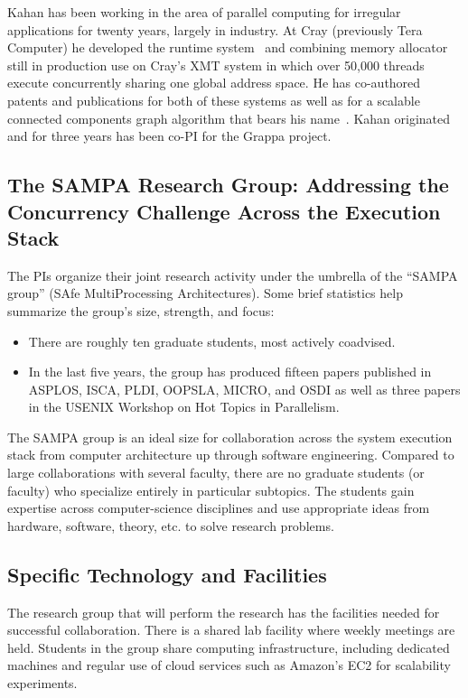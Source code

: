 Kahan has been working in the area of parallel computing for irregular applications for twenty years, largely in industry.  At Cray (previously Tera Computer) he developed the runtime system~\cite{Alverson95schedulingon,Alverson97terahardware-software} and combining memory allocator~\cite{MAMA} still in production use on Cray's XMT system in which over 50,000 threads execute concurrently sharing one global address space.  He has co-authored patents and publications for both of these systems as well as for a scalable connected components graph algorithm that bears his name~\cite{Underwood07analyzingthe}. Kahan originated and for three years has been co-PI for the Grappa project.

\subsection*{The SAMPA Research Group: Addressing the Concurrency
  Challenge Across the Execution Stack}

The PIs organize their joint research activity under the umbrella of
the ``SAMPA group'' (SAfe MultiProcessing Architectures).  Some brief
statistics help summarize the group's size, strength, and focus:
\begin{itemize}
\item There are roughly ten graduate students, most actively
  coadvised.
\item In the last five years, the group has produced fifteen papers
  published in ASPLOS, ISCA, PLDI, OOPSLA, MICRO, and OSDI as well as three
  papers in the USENIX Workshop on Hot Topics in Parallelism.
\end{itemize}
The SAMPA group is an ideal size for collaboration across the system
execution stack from computer architecture up through software
engineering.  Compared to large collaborations with several faculty,
there are no graduate students (or faculty) who specialize entirely in
particular subtopics.  The students gain expertise across
computer-science disciplines and use appropriate ideas from hardware,
software, theory, etc. to solve research problems.  

\subsection*{Specific Technology and Facilities}

The research group that will perform the research has the facilities
needed for successful collaboration.  There is a shared lab facility
where weekly meetings are held.  Students in the group share computing
infrastructure, including dedicated machines and regular use of cloud
services such as Amazon's EC2 for scalability experiments.

